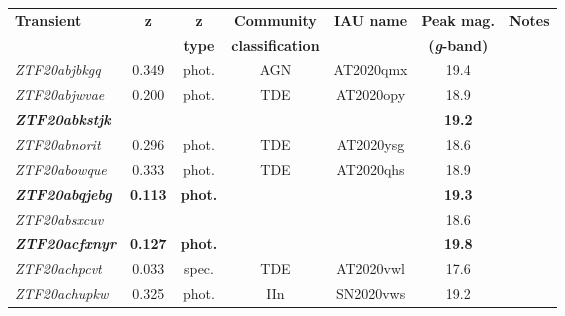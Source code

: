 \begin{table*}
  \begin{tabular}{l  c  c  c   c  c  c}
    \hline
    \textbf{Transient}             & \textbf{z}     & \textbf{z}     & \textbf{Community}      & \textbf{IAU name}  & \textbf{Peak mag.}         & \textbf{Notes}       \\
                                   &                & \textbf{type}  & \textbf{classification} &                    & \textbf{(\textit{g}-band)} &                      \\
    \hline
    \hline
    \textit{ZTF20abjbkgq}          & 0.349          & phot.          & AGN                     & AT2020qmx          & 19.4                       &                      \\
    \textit{ZTF20abjwvae}          & 0.200          & phot.          & TDE                     & AT2020opy          & 18.9                       &                      \\
    \textbf{\textit{ZTF20abkstjk}} & ~              & ~              & ~                       & ~                  & \textbf{19.2}              &                      \\
    \textit{ZTF20abnorit}          & 0.296          & phot.          & TDE                     & AT2020ysg          & 18.6                       &                      \\
    \textit{ZTF20abowque}          & 0.333          & phot.          & TDE                     & AT2020qhs          & 18.9                       &                      \\
    \textbf{\textit{ZTF20abqjebg}} & \textbf{0.113} & \textbf{phot.} & ~                       & ~                  & \textbf{19.3}              &                      \\
    \textit{ZTF20absxcuv}          & ~              & ~              & ~                       & ~                  & 18.6                       &                      \\
    \textbf{\textit{ZTF20acfxnyr}} & \textbf{0.127} & \textbf{phot.} & ~                       & ~                  & \textbf{19.8}              &                      \\
    \textit{ZTF20achpcvt}          & 0.033          & spec.          & TDE                     & AT2020vwl          & 17.6                       &                      \\
    \textit{ZTF20achupkw}          & 0.325          & phot.          & IIn                     & SN2020vws          & 19.2                       &                      \\

\end{tabular}
\end{table*}
